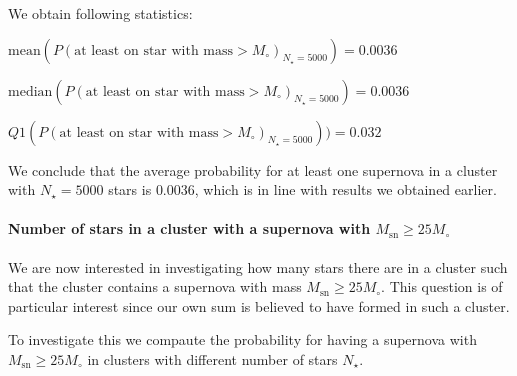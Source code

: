 \documentclass[11pt]{article}
\begin{document}
    We obtain following statistics:

\(\text{mean}(P(\text{at least on star with mass} > M_{\circ})_{N_{\star}=5000}) = 0.0036\)

\(\text{median}(P(\text{at least on star with mass} > M_{\circ})_{N_{\star}=5000}) = 0.0036\)

\(Q1(P(\text{at least on star with mass} > M_{\circ})_{N_{\star}=5000})) = 0.032\)

We conclude that the average probability for at least one supernova in a
cluster with \(N_{\star} = 5000\) stars is \(0.0036\), which is in line
with results we obtained earlier.

    \paragraph{\texorpdfstring{Number of stars in a cluster with a supernova
with
\(M_{\text{sn}} \geq 25 M_{\circ}\)}{Number of stars in a cluster with a supernova with M\_\{\textbackslash{}text\{sn\}\} \textbackslash{}geq 25 M\_\{\textbackslash{}circ\}}}\label{number-of-stars-in-a-cluster-with-a-supernova-with-m_textsn-geq-25-m_circ}

    We are now interested in investigating how many stars there are in a
cluster such that the cluster contains a supernova with mass
\(M_{\text{sn}} \geq 25 M_{\circ}\). This question is of particular
interest since our own sum is believed to have formed in such a cluster.

To investigate this we compaute the probability for having a supernova
with \(M_{\text{sn}} \geq 25 M_{\circ}\) in clusters with different
number of stars \(N_{\star}\).
\end{document}
